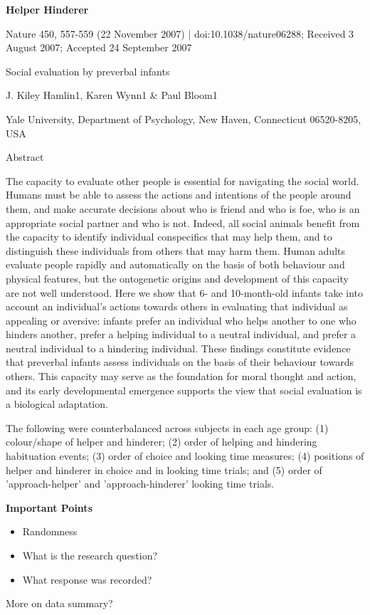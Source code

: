 \def\theTopic{Reading 3}

\begin{center}
{\bf {\large Helper Hinderer}}
\end{center}


Nature 450, 557-559 (22 November 2007) | doi:10.1038/nature06288; Received 3 August 2007; Accepted 24 September 2007

Social evaluation by preverbal infants

J. Kiley Hamlin1, Karen Wynn1 \& Paul Bloom1

    Yale University, Department of Psychology, New Haven, Connecticut
    06520-8205, USA 


Abstract

The capacity to evaluate other people is essential for navigating the
social world. Humans must be able to assess the actions and intentions
of the people around them, and make accurate decisions about who is
friend and who is foe, who is an appropriate social partner and who is
not. Indeed, all social animals benefit from the capacity to identify
individual conspecifics that may help them, and to distinguish these
individuals from others that may harm them. Human adults evaluate
people rapidly and automatically on the basis of both behaviour and
physical features, but the ontogenetic origins and
development of this capacity are not well understood. Here we show
that 6- and 10-month-old infants take into account an individual's
actions towards others in evaluating that individual as appealing or
aversive: infants prefer an individual who helps another to one who
hinders another, prefer a helping individual to a neutral individual,
and prefer a neutral individual to a hindering individual. These
findings constitute evidence that preverbal infants assess individuals
on the basis of their behaviour towards others. This capacity may
serve as the foundation for moral thought and action, and its early
developmental emergence supports the view that social evaluation is a
biological adaptation. 

The following were counterbalanced across subjects in each age group:
(1) colour/shape of helper and hinderer; (2) order of helping and
hindering habituation events; (3) order of choice and looking time
measures; (4) positions of helper and hinderer in choice and in
looking time trials; and (5) order of 'approach-helper' and
'approach-hinderer' looking time trials. 

 \begin{center}
   {\large\bf Important Points}
 \end{center}
 \begin{itemize}
 \item Randomness
 \item What is the research question?
 \item What response was recorded?
 \end{itemize}

More on data summary?


